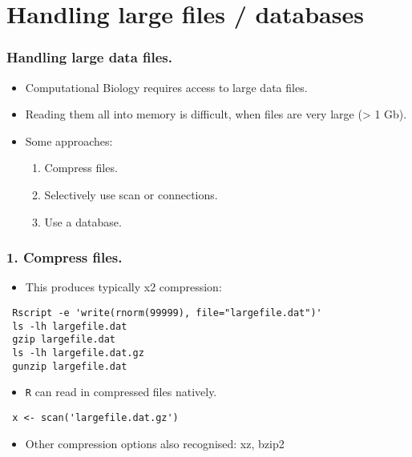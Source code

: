 \documentclass{beamer}
\newcommand{\R}{\texttt{R} }
\begin{document}
\section{Handling large files / databases}
\label{sec-4}
\begin{frame}
\frametitle{Handling large data files.}
\label{sec-4-1}

\begin{itemize}
\item Computational Biology requires access to large data files.
\item Reading them all into memory is difficult, when files are very large
     (> 1 Gb).
\item Some approaches:
\begin{enumerate}
\item Compress files.
\item Selectively use scan or connections.
\item Use a database.
\end{enumerate}
\end{itemize}
\end{frame}
\begin{frame}[fragile]
\frametitle{1. Compress files.}
\label{sec-4-2}


\begin{itemize}
\item This produces typically x2 compression:
\end{itemize}

\begin{verbatim}
 Rscript -e 'write(rnorm(99999), file="largefile.dat")'
 ls -lh largefile.dat
 gzip largefile.dat
 ls -lh largefile.dat.gz
 gunzip largefile.dat
\end{verbatim}

\begin{itemize}
\item \R can read in compressed files natively.
\end{itemize}

\begin{verbatim}
 x <- scan('largefile.dat.gz')
\end{verbatim}

\begin{itemize}
\item Other compression options also recognised: xz, bzip2
\end{itemize}
\end{frame}
\end{document}
